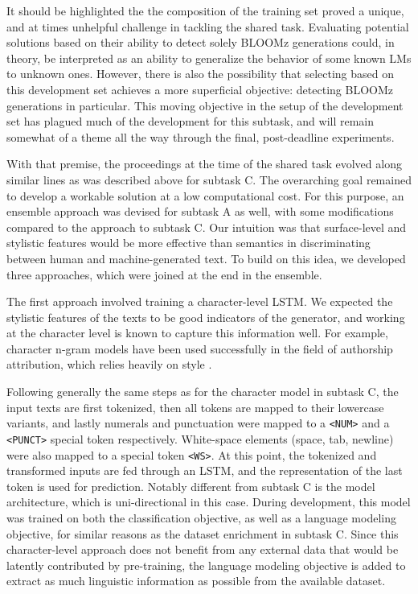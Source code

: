 It should be highlighted the the composition of the training set proved a unique, and at times unhelpful challenge in tackling the shared task.
Evaluating potential solutions based on their ability to detect solely BLOOMz generations could, in theory, be interpreted as an ability to generalize the behavior of some known LMs to unknown ones.
However, there is also the possibility that selecting based on this development set achieves a more superficial objective: detecting BLOOMz generations in particular.
This moving objective in the setup of the development set has plagued much of the development for this subtask, and will remain somewhat of a theme all the way through the final, post-deadline experiments.

With that premise, the proceedings at the time of the shared task evolved along similar lines as was described above for subtask C.
The overarching goal remained to develop a workable solution at a low computational cost.
For this purpose, an ensemble approach was devised for subtask A as well, with some modifications compared to the approach to subtask C.
Our intuition was that surface-level and stylistic features would be more effective than semantics in discriminating between human and machine-generated text. To build on this idea, we developed three approaches, which were joined at the end in the ensemble.

The first approach involved training a character-level LSTM. We expected the stylistic features of the texts to be good indicators of the generator, and working at the character level is known to capture this information well.
For example, character n-gram models have been used successfully in the field of authorship attribution, which relies heavily on style \citep{stamatatos2013robustness}.

Following generally the same steps as for the character model in subtask C, the input texts are first tokenized, then all tokens are mapped to their lowercase variants, and lastly numerals and punctuation were mapped to a \verb|<NUM>| and a \verb|<PUNCT>| special token respectively.
White-space elements (space, tab, newline) were also mapped to a special token \verb|<WS>|.
At this point, the tokenized and transformed inputs are fed through an LSTM, and the representation of the last token is used for prediction.
Notably different from subtask C is the model architecture, which is uni-directional in this case.
During development, this model was trained on both the classification objective, as well as a language modeling objective, for similar reasons as the dataset enrichment in subtask C.
Since this character-level approach does not benefit from any external data that would be latently contributed by pre-training, the language modeling objective is added to extract as much linguistic information as possible from the available dataset.


